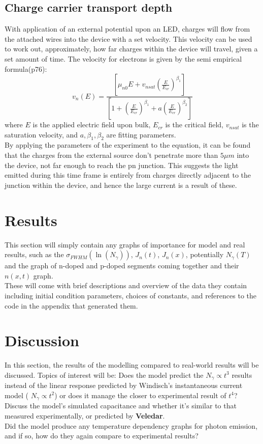 \documentclass[titlepage]{article}
\begin{document}
\subsection{Charge carrier transport depth}
With application of an external potential upon an LED, charges will flow from the attached wires into the device with a set velocity. This velocity can be used to work out, approximately, how far charges within the device will travel, given a set amount of time. The velocity for electrons is given by the semi empirical formula\cite{NSD}(p76):
\begin{equation}
v_n(E) = \dfrac{[\mu_{n0}E+v_{nsat}(\frac{E}{E_{cr}})^{\beta_1}]}{[1+(\frac{E}{E_{cr}})^{\beta_1}+a(\frac{E}{E_{cr}})^{\beta_2}]}
\end{equation}
where $E$ is the applied electric field upon bulk, $E_{cr}$ is the critical field, $v_{nsat}$ is the saturation velocity, and $a, \beta_1, \beta_2$ are fitting parameters. \\ 
By applying the parameters of the experiment to the equation, it can be found that the charges from the external source don't penetrate more than $5\mu m$ into the device, not far enough to reach the pn junction. This suggests the light emitted during this time frame is entirely from charges directly adjacent to the junction within the device, and hence the large current is a result of these. 


\section{Results}
This section will simply contain any graphs of importance for model and real results, such as the $\sigma_{FWHM}(\ln(N_{\gamma}))$, $J_n(t)$, $J_n(x)$, potentially $N_{\gamma}(T)$ and the graph of n-doped and p-doped segments coming together and their $n(x,t)$ graph. \\ These will come with brief descriptions and overview of the data they contain including initial condition parameters, choices of constants, and references to the code in the appendix that generated them.
\section{Discussion}
In this section, the results of the modelling compared to real-world results will be discussed. Topics of interest will be: Does the model predict the $N_{\gamma} \propto t^{3} $ results instead of the linear response predicted by Windisch's instantaneous current model ( $N_{\gamma} \propto t^{2} $) or does it manage the closer to experimental result of $t^{4}$?\\
Discuss the model's simulated capacitance and whether it's similar to that measured experimentally, or predicted by \textbf{Veledar}.\\
Did the model produce any temperature dependency graphs for photon emission, and if so, how do they again compare to experimental results?
\end{document}
